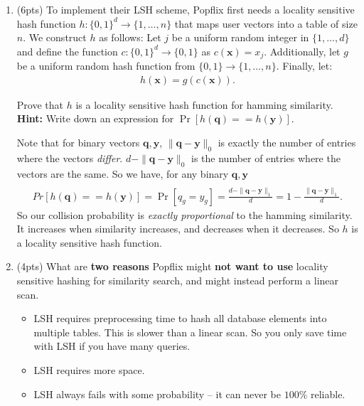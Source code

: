 \documentclass[10pt]{article}
\newcommand{\bv}[1]{\mathbf{#1}}
\begin{document}
\begin{enumerate}[label=(\alph*)]
	\item (6pts) 
	To implement their LSH scheme, Popflix first needs a locality sensitive hash function $h: \{0,1\}^d \rightarrow \{1, \dots, n\}$ that maps user vectors into a table of size $n$. We construct $h$ as follows:
	Let $j$ be a uniform random integer in $\{1, \ldots, d\}$ and define the function $c: \{0,1\}^d \rightarrow \{0,1\}$ as $c(\bv{x}) = x_j$. Additionally, let $g$ be a uniform random hash function from $\{0,1\} \rightarrow \{1, \ldots, n\}$. Finally, let:
	\begin{align*}
		h(\bv{x}) = g(c(\bv{x})).
	\end{align*}
	
	Prove that $h$ is a locality sensitive hash function for {hamming similarity}. \textbf{Hint:} Write down an expression for $\Pr[h(\bv{q}) == h(\bv{y})]$. 
	
		Note that for binary vectors $\bv{q},\bv{y}$, $\|\bv{q} - \bv{y}\|_0$ is exactly the number of entries where the vectors \emph{differ}. $d -\|\bv{q} - \bv{y}\|_0$ is the number of entries where the vectors are the same. So we have, for any binary $\bv{q},\bv{y}$
	\begin{align*}
		\\Pr[h(\bv{q}) == h(\bv{y})] = \Pr[q_g = y_g] =  \frac{d - \|\bv{q} - \bv{y}\|_1}{d} = 1 - \frac{\|\bv{q} - \bv{y}\|_1}{d}.
	\end{align*}
	So our collision probability is \emph{exactly proportional} to the hamming similarity. It increases when similarity increases, and decreases when it decreases. So $h$ is a locality sensitive hash function.
	
	
	\item (4pts) What are \textbf{two reasons} Popflix might \textbf{not want to use} locality sensitive hashing for similarity search, and might instead perform a linear scan. 
	\begin{itemize}
		\item LSH requires preprocessing time to hash all database elements into multiple tables. This is slower than a linear scan. So you only save time with LSH if you have many queries. 
		\item LSH requires more space. 
		\item LSH always fails with some probability -- it can never be $100 \% $ reliable. 
	\end{itemize}
\end{enumerate}
\end{document}
